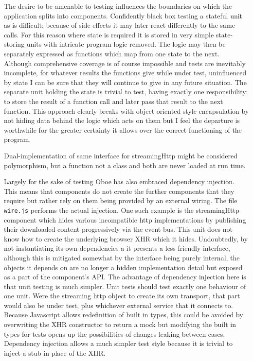 \documentclass[]{article}
\begin{document}
The desire to be amenable to testing influences the boundaries on which
the application splits into components. Confidently black box testing a
stateful unit as is difficult; because of side-effects it may later
react differently to the same calls. For this reason where state is
required it is stored in very simple state-storing units with intricate
program logic removed. The logic may then be separately expressed as
functions which map from one state to the next. Although comprehensive
coverage is of course impossible and tests are inevitably incomplete,
for whatever results the functions give while under test, uninfluenced
by state I can be sure that they will continue to give in any future
situation. The separate unit holding the state is trivial to test,
having exactly one responsibility: to store the result of a function
call and later pass that result to the next function. This approach
clearly breaks with object oriented style encapsulation by not hiding
data behind the logic which acts on them but I feel the departure is
worthwhile for the greater certainty it allows over the correct
functioning of the program.

Dual-implementation of same interface for streamingHttp might be
considered polymorphism, but a function not a class and both are never
loaded at run time.

Largely for the sake of testing Oboe has also embraced dependency
injection. This means that components do not create the further
components that they require but rather rely on them being provided by
an external wiring. The file \texttt{wire.js} performs the actual
injection. One such example is the streamingHttp component which hides
various incompatible http implementations by publishing their downloaded
content progressively via the event bus. This unit does not know how to
create the underlying browser XHR which it hides. Undoubtedly, by not
instantiating its own dependencies a it presents a less friendly
interface, although this is mitigated somewhat by the interface being
purely internal, the objects it depends on are no longer a hidden
implementation detail but exposed as a part of the component's API. The
advantage of dependency injection here is that unit testing is much
simpler. Unit tests should test exactly one behaviour of one unit. Were
the streaming http object to create its own transport, that part would
also be under test, plus whichever external service that it connects to.
Because Javascript allows redefinition of built in types, this could be
avoided by overwriting the XHR constructor to return a mock but
modifying the built in types for tests opens up the possibilities of
changes leaking between cases. Dependency injection allows a much
simpler test style because it is trivial to inject a stub in place of
the XHR.
\end{document}
